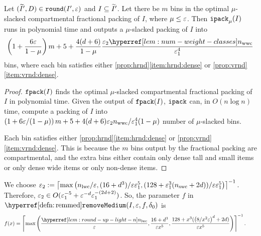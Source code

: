 \begin{theorem}
\label{thm:ipack}
Let $(\widetilde{I}', D) \in \operatorname{\mathtt{round}}(I', \varepsilon)$ and $I \subseteq \widetilde{I}'$.
Let there be $m$ bins in the optimal $\mu$-slacked compartmental fractional packing of $I$,
where $\mu \le \varepsilon$. Then $\operatorname{\mathtt{ipack}}_{\mu}(I)$ runs in polynomial time and outputs
a $\mu$-slacked packing of $I$ into
\[ \left( 1 + \frac{6\eps}{1-\mu}\right)m + 5
    + \frac{4(d+6)}{1-\mu} \frac{\epsSmall\nwwcHyp}{\epsLarge^4} \]
bins, where each bin satisfies either \cref{prop:hrnd}\ref{item:hrnd:dense}
or \cref{prop:vrnd}\ref{item:vrnd:dense}.
\end{theorem}
\begin{proof}
$\operatorname{\mathtt{fpack}}(I)$ finds the optimal $\mu$-slacked compartmental fractional packing
of $I$ in polynomial time. Given the output of $\operatorname{\mathtt{fpack}}(I)$, $\operatorname{\mathtt{ipack}}$ can, in $O(n\log n)$ time,
compute a packing of $I$ into
$\left( 1 + 6\varepsilon/(1-\mu)\right)m + 5
+ 4(d+6)\varepsilon_2 n_{\mathrm{wwc}}/\varepsilon_1^4(1-\mu)$ number of $\mu$-slacked bins.

Each bin satisfies either \cref{prop:hrnd}\ref{item:hrnd:dense}
or \cref{prop:vrnd}\ref{item:vrnd:dense}.
This is because the $m$ bins output by the fractional packing are compartmental,
and the extra bins either contain only dense tall and small items or
only dense wide items or only non-dense items.
\end{proof}

We choose
$\varepsilon_2 := \left\lceil \max\left(n_{\mathrm{lwc}}/\varepsilon, (16 + d^3)/\varepsilon\varepsilon_1^5,
    (128 + \varepsilon_1^3(n_{\mathrm{swc}} + 2d))/\varepsilon\varepsilon_1^5\right) \right\rceil^{-1}$.
Therefore,
$\varepsilon_2 \in O(\varepsilon_1^{-5} + \varepsilon^{-d}\varepsilon_1^{-(2d+2)})$.
So, the parameter $f$ in $\remMedHyp(I, \eps, f, \delta_0)$ is
\begin{equation} \label{eqn:remmed-f} f(x) = \ceil{\max\left(
    \frac{\nlwcHyp}{\eps}, \frac{16 + d^3}{\eps x^5},
    \frac{128 + x^3(\left(8/x^2\eps\right)^d + 2d)}{\eps x^5}\right)}^{-1}.
    \tag*{}
\end{equation}

